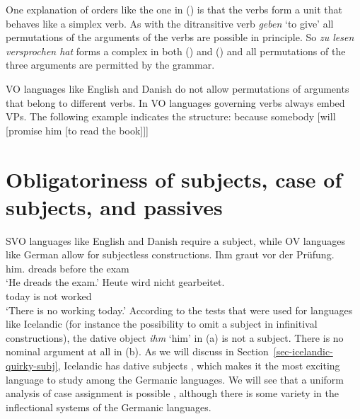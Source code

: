 One explanation of orders like the one in () is that the verbs form a unit that behaves like a simplex verb. As with
the ditransitive verb \emph{geben} `to give' all permutations of the arguments of the verbs are
possible in principle. So \emph{zu lesen versprochen hat} forms a complex in both () and
() and all permutations of the three arguments are permitted by the grammar.

VO languages like English and Danish do not allow permutations of arguments that belong to different
verbs. In VO languages governing verbs always embed VPs. The following example indicates the
structure:
\ea
because somebody [will [promise him [to read the book]]]
\z



\section{Obligatoriness of subjects, case of subjects, and passives}

SVO languages like English and Danish require a subject, while OV languages like German allow for
subjectless constructions.
\eal
\ex 
\gll Ihm graut vor der Prüfung.\\
     him.\dat{} dreads before the exam\\\german
\glt `He dreads the exam.'
\ex 
\gll Heute wird nicht gearbeitet.\\
     today is   not worked\\
\glt `There is no working today.'
\zl
According to the tests that were used for languages like Icelandic (for instance the possibility to
omit a subject in infinitival constructions), the dative object \emph{ihm} `him' in (a) is
not a subject. There is no nominal argument at all in (b). As we will discuss in
Section~\ref{sec-icelandic-quirky-subj}, Icelandic has dative subjects \citep{ZMT85a}, which makes it the most
exciting language to study among the Germanic languages. We will see that a uniform analysis of case
assignment is possible \citep*{YMJ87}, although there is some variety in the inflectional systems of the Germanic languages.



